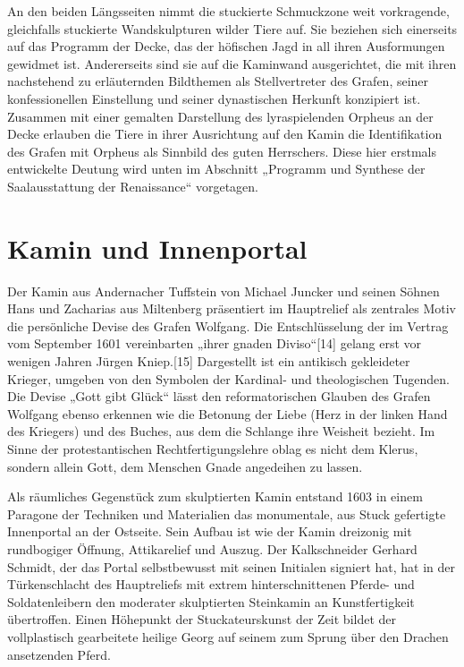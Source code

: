\documentclass[
  letterpaper,
]{book}
\begin{document}
An den beiden Längsseiten nimmt die stuckierte Schmuckzone weit
vorkragende, gleichfalls stuckierte Wandskulpturen wilder Tiere auf. Sie
beziehen sich einerseits auf das Programm der Decke, das der höfischen
Jagd in all ihren Ausformungen gewidmet ist. Andererseits sind sie auf
die Kaminwand ausgerichtet, die mit ihren nachstehend zu erläuternden
Bildthemen als Stellvertreter des Grafen, seiner konfessionellen
Einstellung und seiner dynastischen Herkunft konzipiert ist. Zusammen
mit einer gemalten Darstellung des lyraspielenden Orpheus an der Decke
erlauben die Tiere in ihrer Ausrichtung auf den Kamin die Identifikation
des Grafen mit Orpheus als Sinnbild des guten Herrschers. Diese hier
erstmals entwickelte Deutung wird unten im Abschnitt „Programm und
Synthese der Saalausstattung der Renaissance`` vorgetagen.

\section{Kamin und Innenportal}\label{kamin-und-innenportal}

Der Kamin aus Andernacher Tuffstein von Michael Juncker und seinen
Söhnen Hans und Zacharias aus Miltenberg präsentiert im Hauptrelief als
zentrales Motiv die persönliche Devise des Grafen Wolfgang. Die
Entschlüsselung der im Vertrag vom September 1601 vereinbarten „ihrer
gnaden Diviso``{[}14{]} gelang erst vor wenigen Jahren Jürgen
Kniep.{[}15{]} Dargestellt ist ein antikisch gekleideter Krieger,
umgeben von den Symbolen der Kardinal- und theologischen Tugenden. Die
Devise „Gott gibt Glück`` lässt den reformatorischen Glauben des Grafen
Wolfgang ebenso erkennen wie die Betonung der Liebe (Herz in der linken
Hand des Kriegers) und des Buches, aus dem die Schlange ihre Weisheit
bezieht. Im Sinne der protestantischen Rechtfertigungslehre oblag es
nicht dem Klerus, sondern allein Gott, dem Menschen Gnade angedeihen zu
lassen.

Als räumliches Gegenstück zum skulptierten Kamin entstand 1603 in einem
Paragone der Techniken und Materialien das monumentale, aus Stuck
gefertigte Innenportal an der Ostseite. Sein Aufbau ist wie der Kamin
dreizonig mit rundbogiger Öffnung, Attikarelief und Auszug. Der
Kalkschneider Gerhard Schmidt, der das Portal selbstbewusst mit seinen
Initialen signiert hat, hat in der Türkenschlacht des Hauptreliefs mit
extrem hinterschnittenen Pferde- und Soldatenleibern den moderater
skulptierten Steinkamin an Kunstfertigkeit übertroffen. Einen Höhepunkt
der Stuckateurskunst der Zeit bildet der vollplastisch gearbeitete
heilige Georg auf seinem zum Sprung über den Drachen ansetzenden Pferd.
\end{document}
